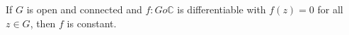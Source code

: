 If $G$ is open and connected and $f: G 	o \mathbb{C}$ is differentiable with $f(z) = 0$ for all $z \in G$, then $f$ is constant.

